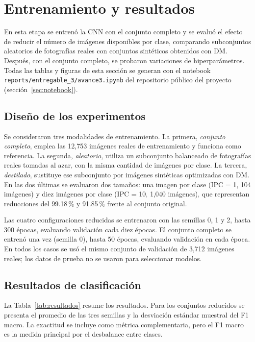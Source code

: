 \section{Entrenamiento y resultados}
En esta etapa se entrenó la CNN con el conjunto completo y se evaluó el efecto de reducir el número de imágenes disponibles por clase, comparando subconjuntos aleatorios de fotografías reales con conjuntos sintéticos obtenidos con DM. Después, con el conjunto completo, se probaron variaciones de hiperparámetros. Todas las tablas y figuras de esta sección se generan con el notebook \texttt{reports/entregable\_3/avance3.ipynb} del repositorio público del proyecto \parencite{repositorio} (sección~\ref{sec:notebook}).

\subsection{Diseño de los experimentos}
Se consideraron tres modalidades de entrenamiento. La primera, \textit{conjunto completo}, emplea las 12,753 imágenes reales de entrenamiento y funciona como referencia. La segunda, \textit{aleatorio}, utiliza un subconjunto balanceado de fotografías reales tomadas al azar, con la misma cantidad de imágenes por clase. La tercera, \textit{destilado}, sustituye ese subconjunto por imágenes sintéticas optimizadas con DM. En las dos últimas se evaluaron dos tamaños: una imagen por clase (IPC = 1, 104 imágenes) y diez imágenes por clase (IPC = 10, 1,040 imágenes), que representan reducciones del 99.18\,\% y 91.85\,\% frente al conjunto original.

Las cuatro configuraciones reducidas se entrenaron con las semillas 0, 1 y 2, hasta 300 épocas, evaluando validación cada diez épocas. El conjunto completo se entrenó una vez (semilla 0), hasta 50 épocas, evaluando validación en cada época. En todos los casos se usó el mismo conjunto de validación de 3,712 imágenes reales; los datos de prueba no se usaron para seleccionar modelos.

\subsection{Resultados de clasificación}
La Tabla~\ref{tab:resultados} resume los resultados. Para los conjuntos reducidos se presenta el promedio de las tres semillas y la desviación estándar muestral del F1 macro. La exactitud se incluye como métrica complementaria, pero el F1 macro es la medida principal por el desbalance entre clases.

